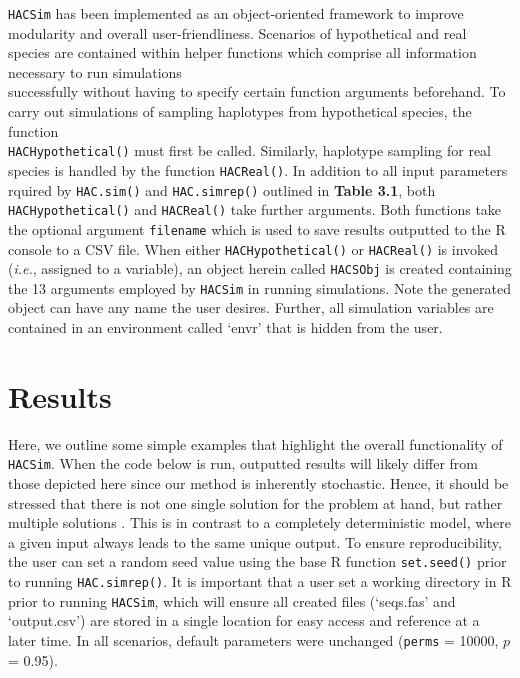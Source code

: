 {\tt HACSim} has been implemented as an object-oriented framework to improve modularity and overall user-friendliness. Scenarios of hypothetical and real species are contained within helper functions which comprise all information necessary to run simulations \\ successfully without having to specify certain function arguments beforehand. To carry out simulations of sampling haplotypes from hypothetical species, the function \\ {\tt HACHypothetical()} must first be called. Similarly, haplotype sampling for real \\ species is handled by the function {\tt HACReal()}. In addition to all input parameters rquired by {\tt HAC.sim()} and {\tt HAC.simrep()} outlined in \textbf{Table 3.1}, both \\ {\tt HACHypothetical()} and {\tt HACReal()} take further arguments. Both functions take the optional argument {\tt filename} which is used to save results outputted to the R console to a CSV file. When either {\tt HACHypothetical()} or {\tt HACReal()} is invoked (\textit{i.e.}, assigned to a variable), an object herein called {\tt HACSObj} is created containing the 13 arguments employed by {\tt HACSim} in running simulations. Note the generated object can have any name the user desires. Further, all simulation variables are contained in an environment called `envr' that is hidden from the user. 


\section{Results}

Here, we outline some simple examples that highlight the overall functionality of \\ {\tt HACSim}. When the code below is run, outputted results will likely differ from those depicted here since our method is inherently stochastic. Hence, it should be stressed that there is not one single solution for the problem at hand, but rather multiple solutions \cite{spall2012stochastic}. This is in contrast to a completely deterministic model, where a given input always leads to the same unique output. To ensure reproducibility, the user can set a random seed value using the base R function {\tt set.seed()} prior to running {\tt HAC.simrep()}. It is important that a user set a working directory in R prior to running {\tt HACSim}, which will ensure all created files (`seqs.fas' and `output.csv') are stored in a single location for easy access and reference at a later time. In all scenarios, default parameters were unchanged ({\tt perms} = 10000, $p$ =  0.95).

